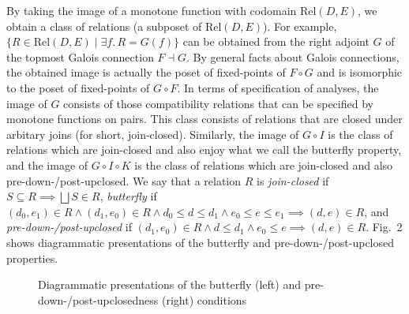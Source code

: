 \documentclass{easychair}
\theoremstyle{definition}
\newcommand{\Rel}{\mathrm{Rel}}
\newcommand{\bigjoin}{\bigsqcup}
\newcommand{\comp}{\circ}
\newcommand{\rotleq}{\rotatebox[origin=c]{90}{$\leq$}}
\begin{document}
By taking the image of a monotone function with codomain $\Rel(D, E)$,
we obtain a class of relations (a subposet of $\Rel(D, E)$). For
example, $\{ R \in \Rel(D, E) \mid \exists f.\, R = G(f) \}$ can be obtained from the right adjoint $G$
of the topmost Galois connection $F \dashv G$. By general
facts about Galois connections, the obtained image is actually the poset of 
fixed-points of $F \comp G$ and is isomorphic to the poset of
fixed-points of $G \comp F$. In terms of specification of analyses, the image
of $G$ consists of those compatibility relations that can be specified by monotone functions on pairs. This class consists of relations that are closed under arbitary joins (for short, join-closed).
Similarly, the image of $G \comp I$ is the class of relations which are join-closed and also enjoy what we call the butterfly property, and the image of $G \comp I \comp K$ is the class of relations which are join-closed and also pre-down-/post-upclosed. We say that a relation $R$ is \emph{join-closed} if $S \subseteq R \implies \bigjoin S \in R$, \emph{butterfly} if $(d_{0}, e_{1}) \in R \land (d_{1}, e_{0}) \in R \land d_{0} \leq d \leq d_{1} \land e_{0} \leq e \leq e_{1} \implies (d , e) \in R$, and \emph{pre-down-/post-upclosed} if $(d_{1}, e_{0}) \in R \land d \leq d_{1} \land e_{0} \leq e \implies (d , e) \in R$. Fig.~2 shows diagrammatic presentations of the butterfly and pre-down-/post-upclosed properties.

\begin{figure}
  \centering
  \label{fig:butterfly}
  \caption{Diagrammatic presentations of the butterfly (left) and pre-down-/post-upclosedness (right) conditions}
\end{figure}
\end{document}
